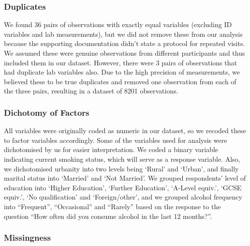 \documentclass[
  11pt,
  twocolumn]{article}
\begin{document}
\subsubsection{Duplicates}\label{duplicates}

We found 36 pairs of observations with exactly equal variables
(excluding ID variables and lab measurements), but we did not remove
these from our analysis because the supporting documentation didn't
state a protocol for repeated visits. We assumed these were genuine
observations from different participants and thus included them in our
dataset. However, there were 3 pairs of observations that had duplicate
lab variables also. Due to the high precision of measurements, we
believed these to be true duplicates and removed one observation from
each of the three pairs, resulting in a dataset of 8201 observations.

\subsubsection{Dichotomy of Factors}\label{dichotomy-of-factors}

All variables were originally coded as numeric in our dataset, so we
recoded these to factor variables accordingly. Some of the variables
used for analysis were dichotomised by us for easier interpretation. We
coded a binary variable indicating current smoking status, which will
serve as a response variable. Also, we dichotomised urbanity into two
levels being `Rural' and `Urban', and finally marital status into
`Married' and `Not Married'. We grouped respondents' level of education
into `Higher Education', `Further Education', `A-Level equiv.', `GCSE
equiv.', `No qualification' and `Foreign/other', and we grouped alcohol
frequency into ``Frequent'', ``Occasional'' and ``Rarely'' based on the
response to the question ``How often did you consume alcohol in the last
12 months?''.

\subsubsection{Missingness}\label{missingness}
\end{document}
